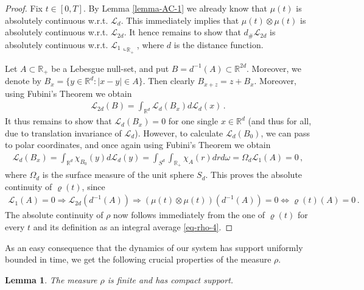 \documentclass[A4paper,11pt]{article}
\newtheorem{lemma}[theorem]{Lemma}
\theoremstyle{definition}
\newcommand{\R}{\mathbb{R}}
\newcommand{\cl}{\mathcal{L}}
\begin{document}
\begin{proof}
	Fix $t\in [0,T]$. By Lemma \ref{lemma-AC-1} we already know that $\mu(t)$ is absolutely continuous w.r.t.
	$\cl_d$. This immediately implies that $\mu(t)\otimes\mu(t)$ is absolutely continuous w.r.t. $\cl_{2d}$. It hence
	remains to show that $d_{\#}\cl_{2d}$ is absolutely continuous w.r.t. $\cl_1\llcorner_{\R_+}$, where $d$ is the distance function.
	
	Let $A\subset\R_+$ be a Lebesgue null-set, and put $B=d^{-1}(A)\subset\R^{2d}$. Moreover, we denote by
	$B_x=\{y\in\R^d:|x-y|\in A\}$. Then clearly $B_{x+z}=z+B_x$. Moreover, using Fubini's Theorem we obtain
	\begin{align*}
		\cl_{2d}(B)=\int_{\R^d}\cl_d(B_x)d\cl_d(x)\,.
	\end{align*}
	It thus remains to show that $\cl_d(B_x)=0$ for one single $x\in\R^d$ (and thus for all, due to translation invariance of $\cl_d$).
	However, to calculate $\cl_d(B_0)$, we can pass to polar coordinates, and once again using Fubini's Theorem
	we obtain
	\begin{align*}
		\cl_d(B_x)=\int_{\R^d}\chi_{B_0}(y)d\cl_d(y)
			=\int_{S^d}\int_{\R_+}\chi_A(r)dr d\omega=\Omega_d\cl_1(A)=0\,,
	\end{align*}
	where $\Omega_d$ is the surface measure of the unit sphere $S_d$. This proves the absolute continuity of
	$\varrho(t)$, since
	\begin{align*}
		\cl_1(A)=0\Longrightarrow\cl_{2d}(d^{-1}(A))
			\Longrightarrow (\mu(t)\otimes\mu(t))(d^{-1}(A))=0\iff\varrho(t)(A)=0\,.
	\end{align*}
	The absolute continuity of $\rho$ now follows immediately from the one of $\varrho(t)$ for every $t$ and its
	definition as an integral average \eqref{eq-rho-4}.
\end{proof}

As an easy consequence that the dynamics of our system has support uniformly bounded in time, we get the following crucial properties of the measure $\rho$.

\begin{lemma}\label{rhocompact}
	The measure $\rho$ is finite and has compact support.
\end{lemma}
\end{document}
